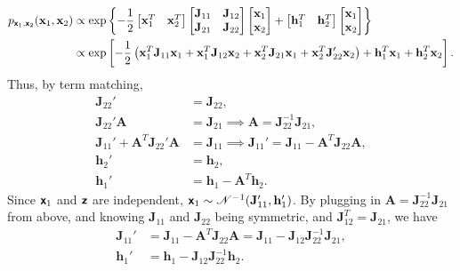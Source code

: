 \documentclass{article}
\newcommand{\bs}[1]{\textsf{\textbf{#1}}}
\newcommand{\qeds}{\hfill\qedsymbol}
\newcommand{\bm}{\mathbf}
\begin{document}
\begin{align*}
p_{\bs{x}_1, \bs{x}_2}(\bm{x}_1, \bm{x}_2) &\propto \exp\left\{ -\frac{1}{2}
\begin{bmatrix}
    \bm{x}_1^T & \bm{x}_2^T 
\end{bmatrix}
\begin{bmatrix}
    \bm{J}_{11} & \bm{J}_{12} \\
    \bm{J}_{21} & \bm{J}_{22}
\end{bmatrix}
\begin{bmatrix}
    \bm{x}_1 \\
    \bm{x}_2
\end{bmatrix} + 
\begin{bmatrix}
    \bm{h}_1^T & \bm{h}_2^T
\end{bmatrix}
\begin{bmatrix}
    \bm{x}_1 \\
    \bm{x}_2
\end{bmatrix}
\right\}\\
&\propto\exp\left[
-\frac{1}{2}\left(
\bm{x}_1^T\bm{J}_{11}\bm{x}_1 +
\bm{x}_1^T\bm{J}_{12}\bm{x}_2 +
\bm{x}_2^T\bm{J}_{21}\bm{x}_1 +
\bm{x}_2^ T\bm{J}_{22}'\bm{x}_2
\right) + 
\bm{h}_1^T \bm{x}_1 +
\bm{h}_2^T \bm{x}_2
\right].
\end{align*}
%
Thus, by term matching,
%
\begin{align*}
	\bm{J}_{22}' &= \bm{J}_{22}, \\
	\bm{J}_{22}'\bm{A} &= \bm{J}_{21} \implies \bm{A} = \bm{J}_{22}^{-1}\bm{J}_{21}, \\
	\bm{J}_{11}' + \bm{A}^T\bm{J}_{22}'\bm{A} &= \bm{J}_{11} \implies \bm{J}_{11}' = \bm{J}_{11} - \bm{A}^T\bm{J}_{22}\bm{A}, \\
	\bm{h}_2' &= \bm{h}_2,\\
	\bm{h}_1' &= \bm{h}_1 - \bm{A}^T\bm{h}_2.
\end{align*}
Since $\bs{x}_1$ and $\bs{z}$ are independent, $\bs{x}_1 \sim \mathscr{N}^{-1}(\bm{J}_{11}', \bm{h}_{1}')$.
By plugging in $\bm{A} = \bm{J}_{22}^{-1}\bm{J}_{21}$ from above, and knowing
$\bm{J}_{11}$ and $\bm{J}_{22}$ being symmetric, and $\bm{J}_{12}^T =\bm{J}_{21}$, we have
\begin{align*}
	\bm{J}_{11}' &= \bm{J}_{11} - \bm{A}^T\bm{J}_{22}\bm{A} = \bm{J}_{11} - \bm{J}_{12}\bm{J}_{22}^{-1}\bm{J}_{21},\\
	\bm{h}_1' &= \bm{h}_1 - \bm{J}_{12}\bm{J}_{22}^{-1}\bm{h}_2.
\end{align*}\qeds
\\
\end{document}
